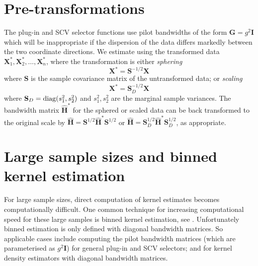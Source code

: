 \documentclass[a4paper,11pt]{article}
\renewcommand{\vec}[1]{\boldsymbol{#1}}
\newcommand{\mat}[1]{\mathbf{#1}}
\def\Hmat{\mat{H}}
\begin{document}
\section{Pre-transformations}
\label{sec:pre}
The plug-in and SCV selector functions use pilot bandwidths of the 
form $\mat{G} = g^2 \mat{I}$ which will be 
inappropriate if the dispersion of the data differs 
markedly between the two coordinate 
directions. We estimate using the transformed data 
$\vec{X}_1^*, \vec{X}_2^*, 
\dots, \vec{X}_n^*$, where the transformation is either {\em sphering} 
$$\vec{X}^*= \mat{S}^{-1/2} \vec{X}$$
where $\mat{S}$ is the sample covariance matrix of the untransformed data; 
or {\em scaling}
$$\vec{X}^*= \mat{S}_D^{-1/2} \vec{X}$$
where $\mat{S}_D = {\rm diag}(s_{1}^2, s_{2}^2)$ and $s_1^2, s_2^2$ are 
the marginal sample variances. The  
bandwidth matrix $\hat{\Hmat}^*$
for the sphered or scaled data can be back transformed to the original scale by 
$\hat{\Hmat} = \mat{S}^{1/2} \hat{\Hmat}^* \mat{S}^{1/2}$ or 
$\hat{\Hmat} = 
\mat{S}_D^{1/2} \hat{\Hmat}^* \mat{S}_D^{1/2}$, as appropriate.

\section{Large sample sizes and binned kernel estimation}
\label{sec:binned}

For large sample sizes, direct computation of kernel estimates becomes 
computationally difficult. One common technique for increasing computational
speed for these large samples is binned kernel estimation, 
see \citet*[Appendix~D]{wand1994}. Unfortunately binned estimation is only defined 
with diagonal bandwidth matrices. So applicable cases include 
computing the pilot bandwidth matrices
(which are parameterised as $g^2 \mat{I}$) for general plug-in and SCV selectors;
and for kernel density estimators with diagonal bandwidth matrices. 
\end{document}
